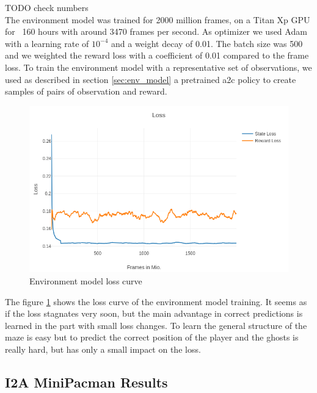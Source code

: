 TODO check numbers\\
The environment model was trained for 2000 million frames, on a Titan Xp GPU for ~160 hours with around 3470 frames per second. As optimizer we used Adam with a learning rate of $10^{-4}$ and a weight decay of 0.01. The batch size was 500 and we weighted the reward loss with a coefficient of 0.01 compared to the frame loss. To train the environment model with a representative set of observations, we used as described in section \ref{sec:env_model} a pretrained a2c policy to create samples of pairs of observation and reward.

\begin{figure}[H] 
  \centering   
  \includegraphics[width=0.7\columnwidth]{./Images/hunt_env_loss_curve.png}
  \caption{Environment model loss curve} 
  \label{fig:env_model_loss} 
\end{figure} 

The figure \ref{fig:env_model_loss} shows the loss curve of the environment model training. It seems as if the loss stagnates very soon, but the main advantage in correct predictions is learned in the part with small loss changes. To learn the general structure of the maze is easy but to predict the correct position of the player and the ghosts is really hard, but has only a small impact on the loss.\\




\subsection{I2A MiniPacman Results}

